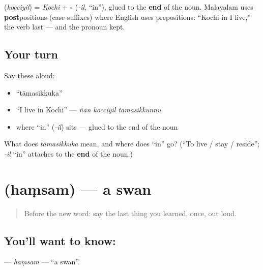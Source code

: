\begin{grammarlens}[title={Grammar Lens: \textquotedblleft{}in\textquotedblright{} comes after the noun}]
\textbf{} (\emph{kocciyil}) = \emph{Kochi} + \textbf{-} (\emph{-il}, \textquotedblleft{}in\textquotedblright{}), glued to the \textbf{end} of the noun. Malayalam uses \textbf{post}positions (case-suffixes) where English uses prepositions: \textquotedblleft{}Kochi-in I live,\textquotedblright{} the verb last — and the pronoun kept.
\end{grammarlens}

\subsection*{Your turn}
Say these aloud:

\begin{itemize}
\raggedright
  \item \textquotedblleft{}tāmasikkuka\textquotedblright{}
  \item \textquotedblleft{}I live in Kochi\textquotedblright{} — \emph{ñān kocciyil tāmasikkunnu}
  \item where \textquotedblleft{}in\textquotedblright{} (\emph{-il}) sits — glued to the end of the noun
\end{itemize}

\begin{tcolorbox}[breakable,colback=teal!4,colframe=teal!35!black,title={Before you move on}]
What does \emph{tāmasikkuka} mean, and where does \textquotedblleft{}in\textquotedblright{} go? (\textquotedblleft{}To live / stay / reside\textquotedblright{}; \emph{-il} \textquotedblleft{}in\textquotedblright{} attaches to the \textbf{end} of the noun.)
\end{tcolorbox}
\section[\texorpdfstring{\ml{ഹംസം} (haṃsam)}{ഹംസം (haṃsam)}]{ (haṃsam) — a swan}

\label{lesson:ML-C05-hamsam}



\begin{quote}
Before the new word: say the last thing you learned, once, out loud.
\end{quote}

\subsection*{You'll want to know: }
\textbf{} — \emph{haṃsam} — \textquotedblleft{}a swan\textquotedblright{}.

